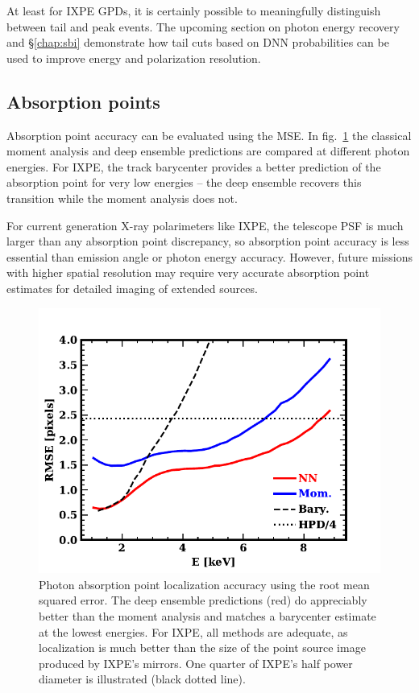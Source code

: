 At least for IXPE GPDs, it is certainly possible to meaningfully distinguish between tail and peak events. 
The upcoming section on photon energy recovery and \S\ref{chap:sbi} demonstrate how tail cuts based on DNN probabilities can be used to improve energy and polarization resolution.


\subsection{Absorption points} 
Absorption point accuracy can be evaluated using the MSE. In fig.~\ref{fig:abspts} the classical moment analysis and deep ensemble predictions are compared at different photon energies. For IXPE, the track barycenter provides a better prediction of the absorption point for very low energies -- the deep ensemble recovers this transition while the moment analysis does not. 

For current generation X-ray polarimeters like IXPE, the telescope PSF is much larger than any absorption point discrepancy, so absorption point accuracy is less essential than emission angle or photon energy accuracy. However, future missions with higher spatial resolution may require very accurate absorption point estimates for detailed imaging of extended sources.

\begin{figure}[t]
\centering
\includegraphics[scale=.65]{figures/fig8_1.pdf}
\caption{Photon absorption point localization accuracy using the root mean squared error. The deep ensemble predictions (red) do appreciably better than the moment analysis and matches a barycenter estimate at the lowest energies. For IXPE, all methods are adequate, as localization is much better than the size of the point source image produced by IXPE's mirrors. One quarter of IXPE's half power diameter is illustrated (black dotted line).}
\label{fig:abspts}       %
\end{figure}



